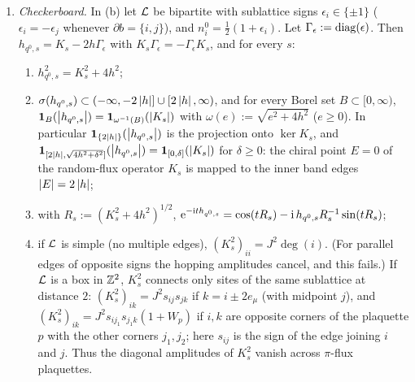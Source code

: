 \begin{proposition}
\begin{enumerate}[label=(\alph*)]
carries the matter state $\ket{n^0}$, and
\begin{equation}\label{eq:2dlawx}
  \langle\Psi(t),O\Psi(t)\rangle=2^{-\beta}\sum_{\varphi\in\TFlux}
  \bigl\langle\Gamma(\e^{-\ii th_{q^0,s^\varphi}})\ket{n^0},\,O_{q^0,s^\varphi}\,\Gamma(\e^{-\ii th_{q^0,s^\varphi}})\ket{n^0}\bigr\rangle ,
  \qquad s^\varphi\in O_\varphi .
\end{equation}
\item \emph{Checkerboard.}  In (b) let $\mathcal{L}$ be bipartite with sublattice signs $\epsilon_i\in\{\pm1\}$
($\epsilon_i=-\epsilon_j$ whenever $\partial b=\{i,j\}$), and $n^0_i=\frac12(1+\epsilon_i)$.  Let
$\Gamma_\epsilon:=\operatorname{diag}(\epsilon)$.  Then $h_{q^0,s}=K_s-2h\Gamma_\epsilon$ with
$K_s\Gamma_\epsilon=-\Gamma_\epsilon K_s$, and for every $s$:
\begin{enumerate}[label=(\roman*)]
\item $h_{q^0,s}^2=K_s^2+4h^2$;
\item $\sigma(h_{q^0,s})\subset(-\infty,-2\left|h\right|]\cup[2\left|h\right|,\infty)$, and for every Borel set $B\subset[0,\infty)$,
$\mathbf{1}_B(\left|h_{q^0,s}\right|)=\mathbf{1}_{\omega^{-1}(B)}(\left|K_s\right|)$ with $\omega(e):=\sqrt{e^2+4h^2}$ ($e\ge0$).  In particular
$\mathbf{1}_{\{2\left|h\right|\}}(\left|h_{q^0,s}\right|)$ is the projection onto $\ker K_s$, and
$\mathbf{1}_{[2\left|h\right|,\sqrt{4h^2+\delta^2}]}(\left|h_{q^0,s}\right|)=\mathbf{1}_{[0,\delta]}(\left|K_s\right|)$ for $\delta\ge0$: the
chiral point $E=0$ of the random-flux operator $K_s$ is mapped to the inner band edges $\left|E\right|=2\left|h\right|$;
\item with $R_s:=(K_s^2+4h^2)^{1/2}$, $\mathrm{e}^{-\mathrm{i} th_{q^0,s}}=\cos(tR_s)-\mathrm{i}\,h_{q^0,s}R_s^{-1}\sin(tR_s)$;
\item if $\mathcal{L}$ is simple (no multiple edges), $(K_s^2)_{ii}=J^2\deg(i)$.  (For parallel edges of opposite signs
the hopping amplitudes cancel, and this fails.)  If $\mathcal{L}$ is a box in $\mathbb{Z}^2$, $K_s^2$ connects only sites of the same
sublattice at distance $2$: $(K_s^2)_{ik}=J^2s_{ij}s_{jk}$ if $k=i\pm2e_\mu$ (with midpoint $j$), and
$(K_s^2)_{ik}=J^2s_{ij_1}s_{j_1k}(1+W_p)$ if $i,k$ are opposite corners of the plaquette $p$ with the other
corners $j_1,j_2$; here $s_{ij}$ is the sign of the edge joining $i$ and $j$.  Thus the diagonal amplitudes of
$K_s^2$ vanish across $\pi$-flux plaquettes.
\end{enumerate}
\end{enumerate}
\end{proposition}


